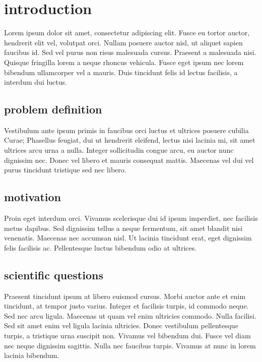 \chapter{introduction}
\label{chap:introduction}
Lorem ipsum dolor sit amet, consectetur adipiscing elit. Fusce eu tortor auctor,
hendrerit elit vel, volutpat orci. Nullam posuere auctor nisl, ut aliquet sapien
faucibus id. Sed vel purus non risus malesuada cursus. Praesent a malesuada
nisi. Quisque fringilla lorem a neque rhoncus vehicula. Fusce eget ipsum nec
lorem bibendum ullamcorper vel a mauris. Duis tincidunt felis id lectus
facilisis, a interdum dui luctus.

\section{problem definition}
\label{sec:introduction/problem_definition}
Vestibulum ante ipsum primis in faucibus orci luctus et ultrices posuere cubilia
Curae; Phasellus feugiat, dui ut hendrerit eleifend, lectus nisi lacinia mi, sit
amet ultrices arcu urna a nulla. Integer sollicitudin congue arcu, eu auctor
nunc dignissim nec. Donec vel libero et mauris consequat mattis. Maecenas vel
dui vel purus tincidunt tristique sed nec libero.

\section{motivation}
\label{sec:introduction/motivation}
Proin eget interdum orci. Vivamus scelerisque dui id ipsum imperdiet, nec
facilisis metus dapibus. Sed dignissim tellus a neque fermentum, sit amet
blandit nisi venenatis. Maecenas nec accumsan nisl. Ut lacinia tincidunt erat,
eget dignissim felis facilisis ac. Pellentesque luctus bibendum odio at
ultrices.

\section{scientific questions}
\label{sec:introduction/scientific_questions}
Praesent tincidunt ipsum at libero euismod cursus. Morbi auctor ante et enim
tincidunt, at tempor justo varius. Integer et facilisis turpis, id commodo
neque. Sed nec arcu ligula. Maecenas ut quam vel enim ultricies commodo.
\newline
Nulla facilisi. Sed sit amet enim vel ligula lacinia ultricies. Donec vestibulum
pellentesque turpis, a tristique urna suscipit non. Vivamus vel bibendum dui.
Fusce vel diam nec neque dignissim sagittis. Nulla nec faucibus turpis. Vivamus
at nunc in lorem lacinia bibendum.
